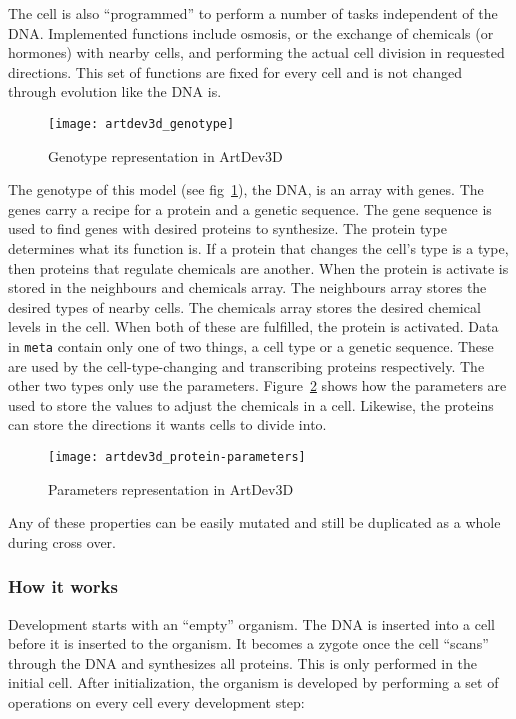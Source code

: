 The cell is also ``programmed'' to perform a number of tasks independent of the DNA. Implemented functions include osmosis, or the exchange of chemicals (or hormones) with nearby cells, and performing the actual cell division in requested directions. This set of functions are fixed for every cell and is not changed through evolution like the DNA is.

\begin{figure}[!ht]
	\centering
	\texttt{[image: artdev3d\_genotype]}
	\caption{Genotype representation in ArtDev3D}
	\label{fig:artdev3d_genotype}
\end{figure}

The genotype of this model (see fig~\ref{fig:artdev3d_genotype}), the DNA, is an array with genes. The genes carry a recipe for a protein and a genetic sequence. The gene sequence is used to find genes with desired proteins to synthesize. The protein type determines what its function is. If a protein that changes the cell's type is a type, then proteins that regulate chemicals are another. When the protein is activate is stored in the neighbours and chemicals array. The neighbours array stores the desired types of nearby cells. The chemicals array stores the desired chemical levels in the cell. When both of these are fulfilled, the protein is activated. Data in \texttt{meta} contain only one of two things, a cell type or a genetic sequence. These are used by the cell-type-changing and transcribing proteins respectively. The other two types only use the parameters. Figure~\ref{fig:artdev3d_protein-parameters} shows how the parameters are used to store the values to adjust the chemicals in a cell. Likewise, the proteins can store the directions it wants cells to divide into.

\begin{figure}[!ht]
	\centering
	\texttt{[image: artdev3d\_protein-parameters]}
	\caption{Parameters representation in ArtDev3D}
	\label{fig:artdev3d_protein-parameters}
\end{figure}

Any of these properties can be easily mutated and still be duplicated as a whole during cross over.

\subsubsection{How it works}
Development starts with an ``empty'' organism. The DNA is inserted into a cell before it is inserted to the organism. It becomes a zygote once the cell ``scans'' through the DNA and synthesizes all proteins. This is only performed in the initial cell. After initialization, the organism is developed by performing a set of operations on every cell every development step:


